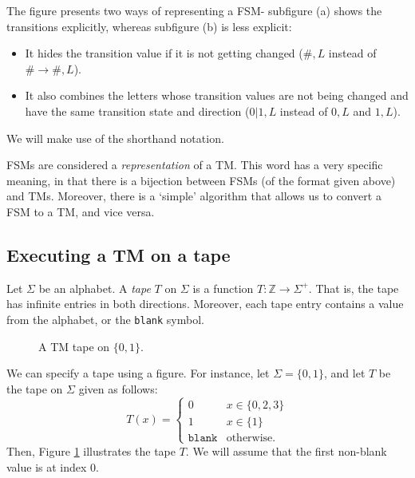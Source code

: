 The figure presents two ways of representing a FSM- subfigure (a) shows the transitions explicitly, whereas subfigure (b) is less explicit:
\begin{itemize}
    \item It hides the transition value if it is not getting changed ($\#, L$ instead of $\# \to \#, L$). 
    \item It also combines the letters whose transition values are not being changed and have the same transition state and direction ($0|1, L$ instead of $0, L$ and $1, L$). 
\end{itemize}
We will make use of the shorthand notation.

FSMs are considered a \emph{representation} of a TM. This word has a very specific meaning, in that there is a bijection between FSMs (of the format given above) and TMs. Moreover, there is a `simple' algorithm that allows us to convert a FSM to a TM, and vice versa.

\subsection{Executing a TM on a tape}
Let $\Sigma$ be an alphabet. A \emph{tape} $T$ on $\Sigma$ is a function $T\colon \mathbb{Z} \to \Sigma^+$. That is, the tape has infinite entries in both directions. Moreover, each tape entry contains a value from the alphabet, or the \texttt{blank} symbol. 

\begin{figure}[htb]
    \centering
    \caption{A TM tape on $\{0, 1\}$.}
    \label{fig:tape_example}
\end{figure}
We can specify a tape using a figure. For instance, let $\Sigma = \{0, 1\}$, and let $T$ be the tape on $\Sigma$ given as follows:
\[T(x) = \begin{cases}
    0 & x \in \{0, 2, 3\} \\
    1 & x \in \{1\} \\
    \texttt{blank} & \text{otherwise}.
\end{cases}\]
Then, Figure \ref{fig:tape_example} illustrates the tape $T$. We will assume that the first non-blank value is at index 0.

